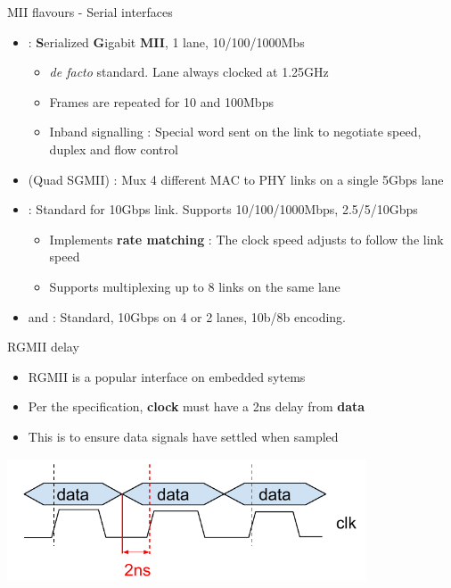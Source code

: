 \begin{frame}{MII flavours - Serial interfaces}
	\begin{itemize}
		\item {} : \textbf{S}erialized \textbf{G}igabit \textbf{MII}, 1 lane, 10/100/1000Mbs
			\begin{itemize}
				\item \textit{de facto} standard. Lane always clocked at 1.25GHz
				\item Frames are repeated for 10 and 100Mbps
				\item Inband signalling : Special word sent on the link to negotiate speed, duplex and flow control
			\end{itemize}
		\item {} (Quad SGMII) : Mux 4 different MAC to PHY links on a single 5Gbps lane
		\item {} : Standard for 10Gbps link. Supports 10/100/1000Mbps, 2.5/5/10Gbps
			\begin{itemize}
				\item Implements \textbf{rate matching} : The clock speed adjusts to follow the link speed
				\item Supports multiplexing up to 8 links on the same lane
			\end{itemize}
		\item {} and  : Standard, 10Gbps on 4 or 2 lanes, 10b/8b encoding.
	\end{itemize}
\end{frame}

\begin{frame}{RGMII delay}
		\begin{itemize}
			\item RGMII is a popular interface on embedded sytems 
			\item Per the specification, \textbf{clock} must have a 2ns delay from \textbf{data}
			\item This is to ensure data signals have settled when sampled
		\end{itemize}
		\begin{center}
			\includegraphics[width=0.8\textwidth]{slides/networking-driver-phy/rgmii_delays.pdf}
		\end{center}
\end{frame}

